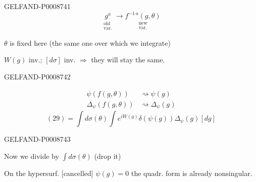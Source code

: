 \begin{GelfandAdjacentEvidence}{GELFAND-P000874}{1}
\begin{equation*}
\underset{\substack{\text{old}\\\text{var.}}}{g^a}
\longrightarrow
\underset{\substack{\text{new}\\\text{var.}}}{f^{-1\,a}(g,\theta)}
\tag{29}
\end{equation*}

$\theta$ is fixed here (the same one over which we integrate)

$W(g)$ inv.; $[d\sigma]$ inv. $\Rightarrow$ they will stay the same.
\end{GelfandAdjacentEvidence}
\begin{GelfandAdjacentEvidence}{GELFAND-P000874}{2}

\[
\begin{aligned}
\psi(f(g,\theta))&\rightsquigarrow\psi(g)\\
\Delta_\psi(f(g,\theta))&\rightsquigarrow\Delta_\psi(g)
\end{aligned}
\]
\begin{equation*}
(29)=\int d\sigma(\theta)\int e^{iW(g)}\delta(\psi(g))\Delta_\psi(g)[dg]
\tag*{\((30):\)}
\end{equation*}
\end{GelfandAdjacentEvidence}
\begin{GelfandAdjacentEvidence}{GELFAND-P000874}{3}


Now we divide by $\int d\sigma(\theta)$ (drop it)

On the hypersurf. [cancelled] $\psi(g)=0$ the quadr. form is already nonsingular.
\end{GelfandAdjacentEvidence}
